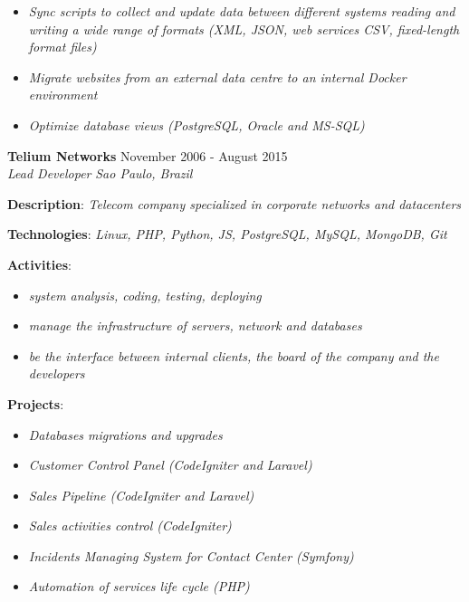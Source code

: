 \documentclass[margin]{res}
\begin{document}
\begin{resume}
\begin{description}
{\begin{itemize}
              \item{\textit{Sync scripts to collect and update data between different systems reading and writing a wide range of formats (XML, JSON, web services      CSV, fixed-length format files)}}
              \item{\textit{Migrate websites from an external data centre to an internal Docker environment}}
              \item{\textit{Optimize database views (PostgreSQL, Oracle and MS-SQL)}}
            \end{itemize}
    }
      \end{description}
    \pagebreak
    \textbf{Telium Networks} \hfill {November 2006 - August 2015}\\
  \textit{Lead Developer} \hfill \textit{Sao Paulo, Brazil}\\
  \begin{description}
    \item{\textbf{Description}: \textit{Telecom company specialized in corporate networks and datacenters}}
    \item{\textbf{Technologies}: \textit{Linux, PHP, Python, JS, PostgreSQL, MySQL, MongoDB, Git}}
    \item{
      \textbf{Activities}:
      \begin{itemize}
              \item{\textit{system analysis, coding, testing, deploying}}
              \item{\textit{manage the infrastructure of servers, network and databases}}
              \item{\textit{be the interface between internal clients, the board of the company and the developers}}
            \end{itemize}
    }
        \item{
      \textbf{Projects}:
      \begin{itemize}
              \item{\textit{Databases migrations and upgrades}}
              \item{\textit{Customer Control Panel (CodeIgniter and Laravel)}}
              \item{\textit{Sales Pipeline (CodeIgniter and Laravel)}}
              \item{\textit{Sales activities control (CodeIgniter)}}
              \item{\textit{Incidents Managing System for Contact Center (Symfony)}}
              \item{\textit{Automation of services life cycle (PHP)}}

\end{itemize}}
\end{description}
\end{resume}
\end{document}
